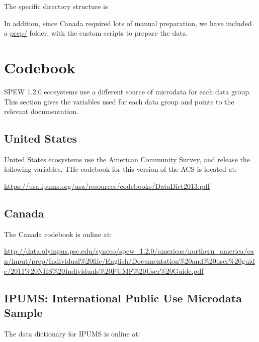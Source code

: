 \documentclass{article}
\begin{document}
The specific directory structure is

\newpage
{}

In addition, since Canada required lots of manual preparation, we have included a \url{prep/} folder, with the custom scripts to prepare the data. 

\newpage



\newpage 
\appendix

\section{Codebook}
SPEW 1.2.0 ecosystems use a different source of microdata for each data group. This section gives the variables used for each data group and points to the relevant documentation. 

\subsection{United States}
United States ecosystems use the American Community Survey, and release the following variables. THe codebook for this version of the ACS is located at:

\vspace{2em}
	\url{https://usa.ipums.org/usa/resources/codebooks/DataDict2013.pdf}
\vspace{2em}

\subsection{Canada}
The Canada codebook is online at:

\vspace{2em}
	\url{http://data.olympus.psc.edu/syneco/spew_1.2.0/americas/northern_america/can/input/prep/Individual%20file/English/Documentation%20and%20user%20guide/2011%20NHS%20Individuals%20PUMF%20User%20Guide.pdf}
\vspace{2em}

\subsection{IPUMS: International Public Use Microdata Sample}
The data dictionary for IPUMS is online at:
\end{document}
